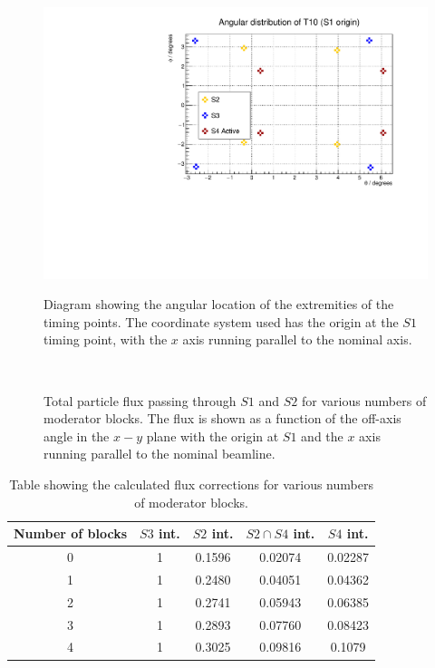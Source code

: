 	\begin{figure}[h]
		\begin{minipage}{0.49\textwidth}
			\centering
			\includegraphics[width=\textwidth]{files/Figures/beamlineAng.pdf}
			\caption{Diagram showing the angular location of the extremities of the timing points. The coordinate system used has the origin at the $S1$ timing 	point, with the $x$ axis running parallel to the nominal axis.}
			\label{fig:beamAng}
		\end{minipage}
		\hspace{0.2cm}
		\begin{minipage}{0.49\textwidth}
			\begin{adjustbox}{max totalsize={\textwidth}{0.5\textheight}, center}
				
			\end{adjustbox}
			\caption{Total particle flux passing through $S1$ and $S2$ for various numbers of moderator blocks. The flux is shown as a function of the off-axis angle in the $x-y$ plane with the origin at $S1$ and the $x$ axis running parallel to the nominal beamline.}
			\label{fig:s1s3all}
		\end{minipage}
		\
	\end{figure}
		
	\begin{table}
		\centering
		\begin{tabular}{|c|c|c|c|c|}
			\hline
			Number of blocks & $S3$ int. & $S2$ int. & $S2 \cap S4$ int. & $S4$ int. \\
			\hline
			0 & 1 & 0.1596 & 0.02074 & 0.02287 \\
			1 & 1 & 0.2480 & 0.04051 & 0.04362 \\
			2 & 1 & 0.2741 & 0.05943 & 0.06385 \\
			3 & 1 & 0.2893 & 0.07760 & 0.08423 \\
			4 & 1 & 0.3025 & 0.09816 & 0.1079  \\
			\hline		
		\end{tabular}
		\caption{Table showing the calculated flux corrections for various numbers of moderator blocks.}
		\label{tab:fluxFactors}
	\end{table}
	